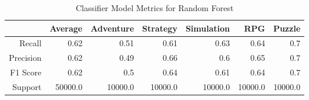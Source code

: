 \begin{table}[h]
    \centering
    \begin{tabular}{r|r|r|r|r|r|r}
        & Average & Adventure & Strategy & Simulation & RPG & Puzzle \\\hline
        Recall      & 0.62 & 0.51 & 0.61 & 0.63 & 0.64 & 0.7\\
        Precision   & 0.62 & 0.49 & 0.66 & 0.6 & 0.65 & 0.7\\
        F1 Score    & 0.62 & 0.5 & 0.64 & 0.61 & 0.64 & 0.7\\
        Support     & 50000.0 & 10000.0 & 10000.0 & 10000.0 & 10000.0 & 10000.0
\end{tabular}
    \caption{Classifier Model Metrics for Random Forest}
    \label{tab:model_metrics}
\end{table}